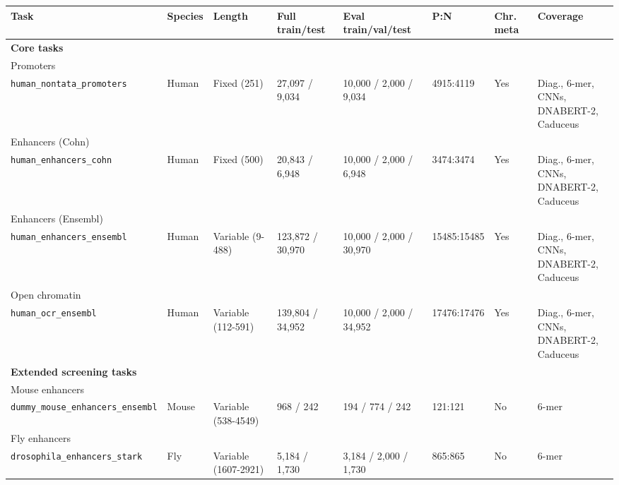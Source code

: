 \begin{tabular}{p{3.35cm}p{0.85cm}p{1.35cm}p{2.0cm}p{2.15cm}p{0.95cm}p{0.9cm}p{2.8cm}}
\toprule
Task & Species & Length & Full train/test & Eval train/val/test & P:N & Chr. meta & Coverage \\
\midrule
\multicolumn{8}{l}{\textbf{Core tasks}} \\
Promoters\\ \scriptsize\texttt{human\_nontata\_promoters} & Human & Fixed (251) & 27,097 / 9,034 & 10,000 / 2,000 / 9,034 & 4915:4119 & Yes & \shortstack[l]{Diag., 6-mer, CNNs,\\DNABERT-2, Caduceus} \\
Enhancers (Cohn)\\ \scriptsize\texttt{human\_enhancers\_cohn} & Human & Fixed (500) & 20,843 / 6,948 & 10,000 / 2,000 / 6,948 & 3474:3474 & Yes & \shortstack[l]{Diag., 6-mer, CNNs,\\DNABERT-2, Caduceus} \\
Enhancers (Ensembl)\\ \scriptsize\texttt{human\_enhancers\_ensembl} & Human & Variable (9-488) & 123,872 / 30,970 & 10,000 / 2,000 / 30,970 & 15485:15485 & Yes & \shortstack[l]{Diag., 6-mer, CNNs,\\DNABERT-2, Caduceus} \\
Open chromatin\\ \scriptsize\texttt{human\_ocr\_ensembl} & Human & Variable (112-591) & 139,804 / 34,952 & 10,000 / 2,000 / 34,952 & 17476:17476 & Yes & \shortstack[l]{Diag., 6-mer, CNNs,\\DNABERT-2, Caduceus} \\
\multicolumn{8}{l}{\textbf{Extended screening tasks}} \\
Mouse enhancers\\ \scriptsize\texttt{dummy\_mouse\_enhancers\_ensembl} & Mouse & Variable (538-4549) & 968 / 242 & 194 / 774 / 242 & 121:121 & No & 6-mer \\
Fly enhancers\\ \scriptsize\texttt{drosophila\_enhancers\_stark} & Fly & Variable (1607-2921) & 5,184 / 1,730 & 3,184 / 2,000 / 1,730 & 865:865 & No & 6-mer \\
\bottomrule
\end{tabular}
